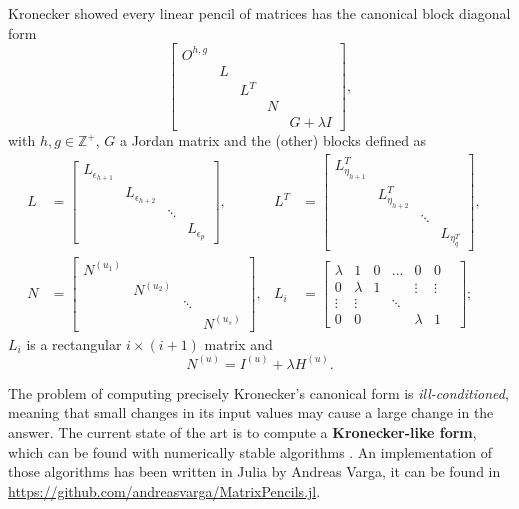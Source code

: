 \vspace{5mm}
Kronecker showed every linear pencil of matrices has the canonical block diagonal form
\[
\begin{bmatrix}
    O^{h, g} \\
    &L \\
    && L^T \\
    &&& N \\
    &&&& G + \lambda I
\end{bmatrix},
\]
with \(h, g \in \mathbb{Z}^+\), $G$ a Jordan matrix and the (other) blocks defined as
\begin{align*}
    L &= \begin{bmatrix}
        L_{\epsilon_{h+1}} \\
        & L_{\epsilon_{h+2}} \\
        & & \ddots \\
        & & & L_{\epsilon_{p}}
    \end{bmatrix}, &
    L^T &= \begin{bmatrix}
        L_{\eta_{h+1}}^T \\
        & L_{\eta_{h+2}}^T \\
        & & \ddots \\
        & & & L_{\eta_{q}^T}
    \end{bmatrix}, &\\
    N &= \begin{bmatrix}
        N^{(u_{1})} \\
        & N^{(u_{2})} \\ 
        & & \ddots \\
        & & & N^{(u_{s})}
    \end{bmatrix}, &
    L_{i} &=
    \begin{bmatrix}
        \lambda        &      1     &       0      &     \ldots       &    0       &    0   \\
        0              & \lambda    &       1      &                  & \vdots     & \vdots \\
        \vdots         & \vdots     &     & \ddots    &      &            &        \\
        0              &      0     &              &                  & \lambda    &    1   
    \end{bmatrix};
\end{align*}
\(L_{i}\) is a rectangular \(i \times (i + 1)\) matrix and
\[
    N^{(u)} = I^{(u)} + \lambda H^{(u)}.
\]

The problem of computing precisely Kronecker's canonical form is \textit{ill-conditioned}, meaning
that small changes in its input values may cause a large change in the answer. The current state of the art is to
compute a \textbf{Kronecker-like form}, which can be found with numerically stable algorithms
\cite{beelen-van_dooren}. An implementation of those
algorithms has been written in Julia \cite{bezanson2017julia} by Andreas Varga, it can be found in
\url{https://github.com/andreasvarga/MatrixPencils.jl}.

